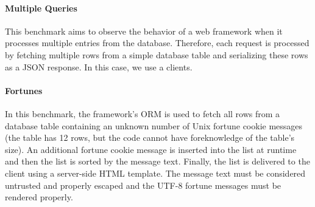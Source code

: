 \paragraph{Multiple Queries}
This benchmark aims to observe the behavior of a web framework when it processes multiple entries from the database.
Therefore, each request is processed by fetching multiple rows from a simple database table and serializing these rows as a JSON response.
In this case, we use a   clients.

\paragraph{Fortunes}
In this benchmark, the framework's ORM is used to fetch all rows from a database table containing an unknown number of Unix fortune cookie messages (the table has 12 rows, but the code cannot have foreknowledge of the table's size).
An additional fortune cookie message is inserted into the list at runtime and then the list is sorted by the message text.
Finally, the list is delivered to the client using a server-side HTML template.
The message text must be considered untrusted and properly escaped and the UTF-8 fortune messages must be rendered properly.

